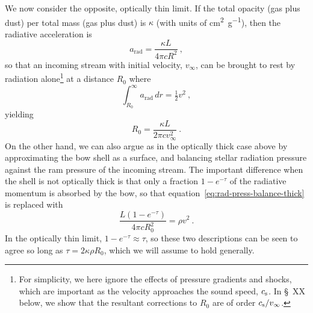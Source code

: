 We now consider the opposite, optically thin limit.  If the total
opacity (gas plus dust) per total mass (gas plus dust) is \(\kappa\) (with
units of \si{cm^2.g^{-1}}), then the radiative acceleration is
\begin{equation}
  \label{eq:rad-accel}
  a_{\text{rad}} = \frac{\kappa L}{4 \pi c R^2} \ , 
\end{equation}
so that an incoming stream with initial velocity, \(v_\infty\), can be
brought to rest by radiation alone\footnote{%
  For simplicity, we here ignore the effects of pressure gradients and
  shocks, which are important as the velocity approaches the sound
  speed, \(c_{\text{s}}\). In \S~XX below, we show that the resultant
  corrections to \(R_0\) are of order \(c_{\text{s}} / v_\infty\).} %
at a distance \(R_0\) where
\begin{equation}
  \label{eq:rad-poten}
  \int_{R_0}^\infty a_{\text{rad}} \, dr = \tfrac12 v^2 \ , 
\end{equation}
yielding
\begin{equation}
  \label{eq:rad:R0}
  R_0 = \frac{\kappa L}{2\pi c v_\infty^2} \ .
\end{equation}
On the other hand, we can also argue as in the optically thick case
above by approximating the bow shell as a surface, and balancing
stellar radiation pressure against the ram pressure of the incoming
stream.  The important difference when the shell is not optically
thick is that only a fraction \(1 - e^{-\tau}\) of the radiative momentum
is absorbed by the bow, so that
equation~\eqref{eq:rad-press-balance-thick} is replaced with
\begin{equation}
  \label{eq:rad-press-balance-tau}
  \frac{L (1 - e^{-\tau})}{4 \pi c R_0^2} = \rho v^2 \ .
\end{equation}
In the optically thin limit, \(1 - e^{-\tau} \approx \tau\), so these two
descriptions can be seen to agree so long as
\(\tau = 2 \kappa \rho R_0\), which we will assume to hold generally.

